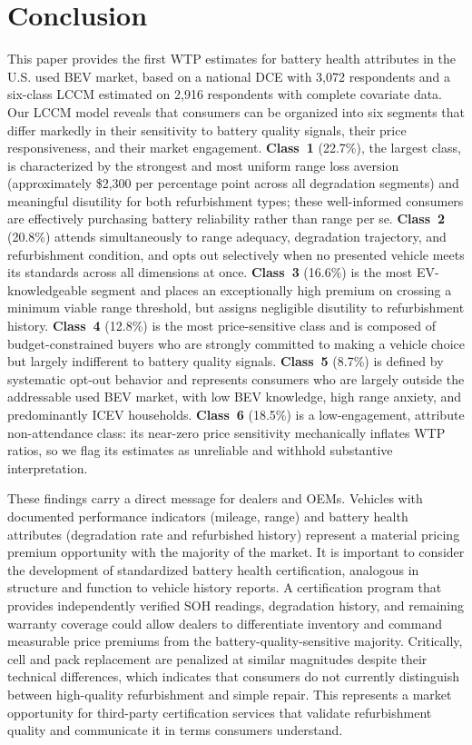 \documentclass[a4paper,fleqn]{cas-sc}   %
\begin{document}
\section{Conclusion}
\label{section:conclusion}
This paper provides the first WTP estimates for battery health attributes in the U.S. used BEV market, based on a national DCE with 3,072 respondents and a six-class LCCM estimated on 2,916 respondents with complete covariate data. Our LCCM model reveals that consumers can be organized into six segments that differ markedly in their sensitivity to battery quality signals, their price responsiveness, and their market engagement. \textbf{Class~1} (22.7\%), the largest class, is characterized by the strongest and most uniform range loss aversion (approximately \$2,300 per percentage point across all degradation segments) and meaningful disutility for both refurbishment types; these well-informed consumers are effectively purchasing battery reliability rather than range per se. \textbf{Class~2} (20.8\%) attends simultaneously to range adequacy, degradation trajectory, and refurbishment condition, and opts out selectively when no presented vehicle meets its standards across all dimensions at once. \textbf{Class~3} (16.6\%) is the most EV-knowledgeable segment and places an exceptionally high premium on crossing a minimum viable range threshold, but assigns negligible disutility to refurbishment history. \textbf{Class~4} (12.8\%) is the most price-sensitive class and is composed of budget-constrained buyers who are strongly committed to making a vehicle choice but largely indifferent to battery quality signals. \textbf{Class~5} (8.7\%) is defined by systematic opt-out behavior and represents consumers who are largely outside the addressable used BEV market, with low BEV knowledge, high range anxiety, and predominantly ICEV households. \textbf{Class~6} (18.5\%) is a low-engagement, attribute non-attendance class: its near-zero price sensitivity mechanically inflates WTP ratios, so we flag its estimates as unreliable and withhold substantive interpretation.

These findings carry a direct message for dealers and OEMs. Vehicles with documented performance indicators (mileage, range) and battery health attributes (degradation rate and refurbished history) represent a material pricing premium opportunity with the majority of the market. It is important to consider the development of standardized battery health certification, analogous in structure and function to vehicle history reports. A certification program that provides independently verified SOH readings, degradation history, and remaining warranty coverage could allow dealers to differentiate inventory and command measurable price premiums from the battery-quality-sensitive majority. Critically, cell and pack replacement are penalized at similar magnitudes despite their technical differences, which indicates that consumers do not currently distinguish between high-quality refurbishment and simple repair. This represents a market opportunity for third-party certification services that validate refurbishment quality and communicate it in terms consumers understand.
\end{document}
